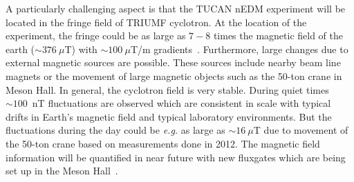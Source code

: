 
A particularly challenging aspect is that the TUCAN nEDM experiment will be located in the fringe field of TRIUMF cyclotron. At the location of the experiment, the fringe could be as large as $7-8$ times the magnetic field of the earth ($\sim376~\mu$T) with $\sim100~\mu$T/m gradients~\cite{sarte}. Furthermore, large changes due to external magnetic sources are possible. These sources include nearby beam line magnets or the movement of large magnetic objects such as the 50-ton crane in Meson Hall. In general, the cyclotron field is very stable. During quiet times  $\sim100$~nT fluctuations are observed which are consistent in scale with typical drifts in Earth's magnetic field and typical laboratory environments. But the fluctuations during the day could be {\it e.g.} as large as  $\sim16~\mu$T due to movement of the 50-ton crane based on measurements done in 2012. The magnetic field information will be quantified in near future with new fluxgates which are being set up in the Meson Hall~\cite{beapriv}.







